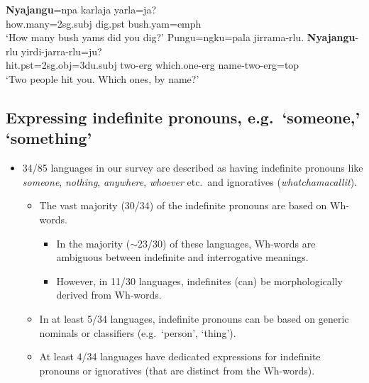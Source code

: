 \documentclass{article}
\makeatletter
\newcommand{\ofy}{/85} %
\makeatother
\begin{document}
\begin{exe}
  \begin{xlist}
    \ex \gll \textbf{Nyajangu}=npa karlaja yarla=ja? \\
    how.many=2{\sc sg.subj} dig.{\sc pst} bush.yam={\sc emph}\\
    \glt `How many bush yams did you dig?'
    \ex \gll Pungu=ngku=pala jirrama-rlu. \textbf{Nyajangu}-rlu yirdi-jarra-rlu=ju? \\
    hit.{\sc pst}=2{\sc sg.obj}=3{\sc du.subj} two-{\sc erg} which.one-{\sc erg} name-two-{\sc erg}={\sc top}\\
    \glt `Two people hit you. Which ones, by name?'
  \end{xlist}
\end{exe}


\subsection{Expressing indefinite pronouns, e.g.\ `someone,' `something'}
\begin{itemize}
\item 34\ofy{} languages  in our survey are described as having indefinite pronouns like \textit{someone}, \textit{nothing}, \textit{anywhere}, \textit{whoever} etc.\ and ignoratives (\textit{whatchamacallit}).

  \begin{itemize}
  \item The vast majority (30/34) of the  indefinite pronouns are based on Wh-words.
    \begin{itemize}
    \item In the majority ($\sim$23/30) of these languages, Wh-words are  ambiguous between indefinite and interrogative meanings.
    \item However, in 11/30 languages, indefinites (can) be morphologically derived from Wh-words.
    \end{itemize}
  \item In at least 5/34 languages,  indefinite pronouns can be based on generic nominals or classifiers (e.g.\ `person', `thing').
  \item At least 4/34 languages have dedicated expressions for indefinite pronouns or ignoratives (that are distinct from the Wh-words).
  \end{itemize}
\end{itemize}
\end{document}
